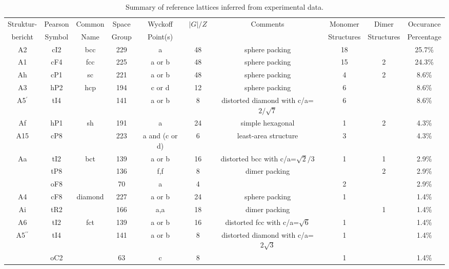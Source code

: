 \documentclass[preprint]{revtex4}              %
\begin{document}
\begin{landscape}
\begin{table}
\caption{Summary of reference lattices inferred from experimental
data.} \label{summary}\scriptsize
\begin{tabular}{cccccccccc}
\hline
Struktur- & Pearson & Common & Space & Wyckoff & $|G|/Z$ & Comments & Monomer & Dimer & Occurance\\
bericht & Symbol & Name & Group & Point(s) & & & Structures & Structures & Percentage\\
\hline
A2  & cI2 & bcc & 229 & a           & 48 & sphere packing                         & 18 &   & 25.7\%\\
A1  & cF4 & fcc & 225 & a or b      & 48 & sphere packing                         & 15 & 2 & 24.3\%\\
Ah  & cP1 & sc  & 221 & a or b      & 48 & sphere packing                         &  4 & 2 & 8.6\%\\
A3  & hP2 & hcp & 194 & c or d      & 12 & sphere packing                         &  6 &   & 8.6\%\\
A5$^\prime$ & tI4 & & 141 & a or b  &  8 & distorted diamond with c/a=$2/\sqrt 7$ &  6 &   & 8.6\%\\
Af  & hP1 & sh  & 191 & a           & 24 & simple hexagonal                       &  1 & 2 & 4.3\%\\
A15 & cP8 &     & 223 & a and (c or d)&6 & least-area structure                   &  3 &   & 4.3\%\\
Aa  & tI2 & bct & 139 & a or b      & 16 & distorted bcc with c/a=$\sqrt 2/3$    &  1 & 1 & 2.9\%\\
    & tP8 &     & 136 & f,f         &  8 & dimer packing                          &    & 2 & 2.9\%\\
    & oF8 &     & 70  & a           &  4 &                                        &  2 &   & 2.9\%\\
A4  & cF8 & diamond & 227 & a or b  & 24 & sphere packing                         &  1 &   & 1.4\%\\
Ai  & tR2 &     & 166 & a,a         & 18 & dimer packing                          &    & 1 & 1.4\%\\
A6  & tI2 & fct & 139 & a or b      & 16 & distorted fcc with c/a=$\sqrt 6$       &  1 &   & 1.4\%\\
A5$^{\prime\prime}$ & tI4 & & 141 & a or b  & 8 & distorted diamond with c/a=$2\sqrt 3$&1& & 1.4\%\\
    & oC2 &     &  63 & c           &  8 &                                        &  1 &   & 1.4\%\\
\hline
\end{tabular}
\end{table}
\end{landscape}
\end{document}
